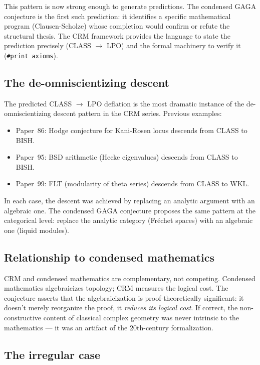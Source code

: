 \documentclass[11pt,a4paper]{article}
\theoremstyle{plain}
\theoremstyle{definition}
\newcommand{\LPO}{\textsf{LPO}}
\newcommand{\CLASS}{\textsf{CLASS}}
\begin{document}
This pattern is now strong enough to generate predictions.
The condensed GAGA conjecture is the first such prediction: it identifies a specific mathematical program (Clausen-Scholze) whose completion would confirm or refute the structural thesis.
The CRM framework provides the language to state the prediction precisely (\CLASS{} $\to$ \LPO) and the formal machinery to verify it (\texttt{\#print axioms}).

\subsection{The de-omniscientizing descent}

The predicted CLASS $\to$ LPO deflation is the most dramatic instance of the de-omniscientizing descent pattern in the CRM series.
Previous examples:
\begin{itemize}[nosep]
\item Paper~86: Hodge conjecture for Kani-Rosen locus descends from CLASS to BISH.
\item Paper~95: BSD arithmetic (Hecke eigenvalues) descends from CLASS to BISH.
\item Paper~99: FLT (modularity of theta series) descends from CLASS to WKL.
\end{itemize}
In each case, the descent was achieved by replacing an analytic argument with an algebraic one.
The condensed GAGA conjecture proposes the same pattern at the categorical level: replace the analytic category (Fréchet spaces) with an algebraic one (liquid modules).

\subsection{Relationship to condensed mathematics}

CRM and condensed mathematics are complementary, not competing.
Condensed mathematics algebraicizes topology; CRM measures the logical cost.
The conjecture asserts that the algebraicization is proof-theoretically significant: it doesn't merely reorganize the proof, it \emph{reduces its logical cost}.
If correct, the non-constructive content of classical complex geometry was never intrinsic to the mathematics --- it was an artifact of the 20th-century formalization.

\subsection{The irregular case}
\end{document}
